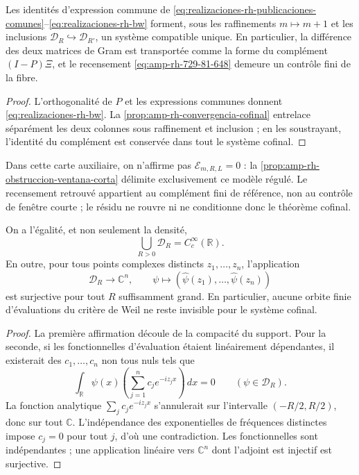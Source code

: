 \begin{proposition}
\label{prop:amp-rh-compatibilidad-complemento-finito}
\label{prop:amp-rh-residual}
Les identités d'expression commune de \eqref{eq:realizaciones-rh-publicaciones-comunes}--\eqref{eq:realizaciones-rh-bw} forment, sous les raffinements \(m\mapsto m+1\) et les inclusions \(\mathcal D_R\hookrightarrow\mathcal D_{R'}\), un système compatible unique. En particulier, la différence des deux matrices de Gram est transportée comme la forme du complément \((I-P)\Xi\), et le recensement \eqref{eq:amp-rh-729-81-648} demeure un contrôle fini de la fibre.
\end{proposition}

\begin{proof}
L'orthogonalité de \(P\) et les expressions communes donnent \eqref{eq:realizaciones-rh-bw}. La \cref{prop:amp-rh-convergencia-cofinal} entrelace séparément les deux colonnes sous raffinement et inclusion ; en les soustrayant, l'identité du complément est conservée dans tout le système cofinal.
\end{proof}

Dans cette carte auxiliaire, on n'affirme pas \(\mathcal E_{m,R,L}=0\) : la \cref{prop:amp-rh-obstruccion-ventana-corta} délimite exclusivement ce modèle régulé. Le recensement retrouvé appartient au complément fini de référence, non au contrôle de fenêtre courte ; le résidu ne rouvre ni ne conditionne donc le théorème cofinal.

\begin{lemma}
\label{lem:amp-rh-separacion-cofinal}
On a l'égalité, et non seulement la densité,
\[
 \bigcup_{R>0}\mathcal D_R=C_c^\infty(\mathbb R).
\]
En outre, pour tous points complexes distincts \(z_1,\ldots,z_n\), l'application
\[
 \mathcal D_R\longrightarrow\mathbb C^n,\qquad
 \psi\longmapsto
 (\widehat\psi(z_1),\ldots,\widehat\psi(z_n))
\]
est surjective pour tout \(R\) suffisamment grand. En particulier, aucune orbite finie d'évaluations du critère de Weil ne reste invisible pour le système cofinal.
\end{lemma}

\begin{proof}
La première affirmation découle de la compacité du support. Pour la seconde, si les fonctionnelles d'évaluation étaient linéairement dépendantes, il existerait des \(c_1,\ldots,c_n\) non tous nuls tels que
\[
 \int_{\mathbb R}\psi(x)
 \left(\sum_{j=1}^nc_je^{-iz_jx}\right)\,dx=0
 \qquad(\psi\in\mathcal D_R).
\]
La fonction analytique \(\sum_jc_je^{-iz_jx}\) s'annulerait sur l'intervalle \((-R/2,R/2)\), donc sur tout \(\mathbb C\). L'indépendance des exponentielles de fréquences distinctes impose \(c_j=0\) pour tout \(j\), d'où une contradiction. Les fonctionnelles sont indépendantes ; une application linéaire vers \(\mathbb C^n\) dont l'adjoint est injectif est surjective.
\end{proof}

